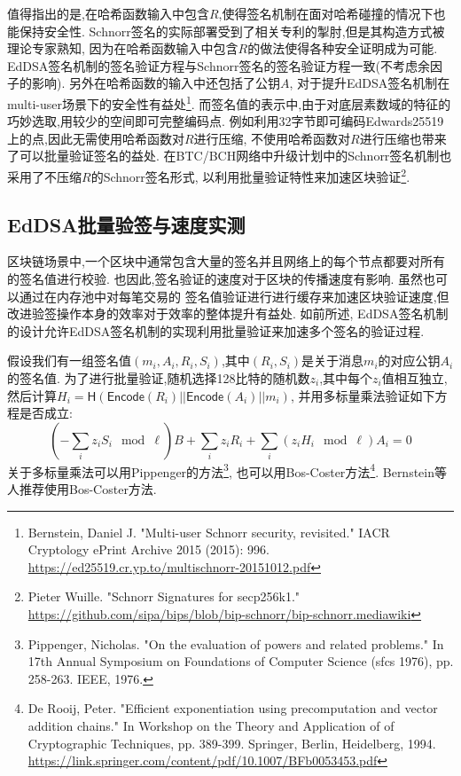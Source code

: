 值得指出的是,在哈希函数输入中包含$R$,使得签名机制在面对哈希碰撞的情况下也能保持安全性.
Schnorr签名的实际部署受到了相关专利的掣肘,但是其构造方式被理论专家熟知,
因为在哈希函数输入中包含$R$的做法使得各种安全证明成为可能.
EdDSA签名机制的签名验证方程与Schnorr签名的签名验证方程一致(不考虑余因子的影响).
另外在哈希函数的输入中还包括了公钥$A$, 
对于提升EdDSA签名机制在multi-user场景下的安全性有益处\footnote{
Bernstein, Daniel J. "Multi-user Schnorr security, revisited." 
IACR Cryptology ePrint Archive 2015 (2015): 996.
\url{https://ed25519.cr.yp.to/multischnorr-20151012.pdf}}.
而签名值的表示中,由于对底层素数域的特征的巧妙选取,用较少的空间即可完整编码点.
例如利用32字节即可编码Edwards25519上的点,因此无需使用哈希函数对$R$进行压缩,
不使用哈希函数对$R$进行压缩也带来了可以批量验证签名的益处.
在BTC/BCH网络中升级计划中的Schnorr签名机制也采用了不压缩$R$的Schnorr签名形式,
以利用批量验证特性来加速区块验证\footnote{
Pieter Wuille. "Schnorr Signatures for secp256k1."
\url{https://github.com/sipa/bips/blob/bip-schnorr/bip-schnorr.mediawiki}}.

\subsection{EdDSA批量验签与速度实测}

区块链场景中,一个区块中通常包含大量的签名并且网络上的每个节点都要对所有的签名值进行校验.
也因此,签名验证的速度对于区块的传播速度有影响. 虽然也可以通过在内存池中对每笔交易的
签名值验证进行进行缓存来加速区块验证速度,但改进验签操作本身的效率对于效率的整体提升有益处.
如前所述, EdDSA签名机制的设计允许EdDSA签名机制的实现利用批量验证来加速多个签名的验证过程.

假设我们有一组签名值$(m_i, A_i, R_i, S_i)$,其中$(R_i, S_i)$是关于消息$m_i$的对应公钥$A_i$的签名值.
为了进行批量验证,随机选择128比特的随机数$z_i$,其中每个$z_i$值相互独立,
然后计算$H_i = \textsf{H}(\textsf{Encode}(R_i) || \textsf{Encode}(A_i) ||m_i)$,
并用多标量乘法验证如下方程是否成立:
$$
\left(-\sum_i z_iS_i \mod \ell\right)B + \sum_i z_i R_i + \sum_i(z_iH_i \mod \ell)A_i = 0
$$
关于多标量乘法可以用Pippenger的方法\footnote{
Pippenger, Nicholas. "On the evaluation of powers and related problems." 
In 17th Annual Symposium on Foundations of Computer Science (sfcs 1976), 
pp. 258-263. IEEE, 1976.},
也可以用Bos-Coster方法\footnote{
De Rooij, Peter. "Efficient exponentiation using precomputation and vector addition chains." 
In Workshop on the Theory and Application of of Cryptographic Techniques, 
pp. 389-399. Springer, Berlin, Heidelberg, 1994.
\url{https://link.springer.com/content/pdf/10.1007/BFb0053453.pdf}}.
Bernstein等人推荐使用Bos-Coster方法.

